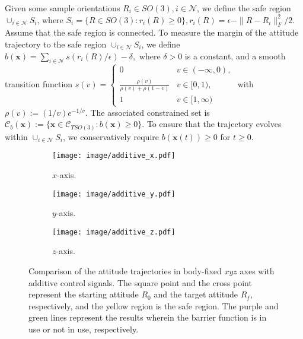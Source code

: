 \documentclass[letterpaper, 10 pt, journal, twoside]{IEEEtran}
\theoremstyle{plain}
\newcommand{\myvar}[1]{\bm{#1}}
\newcommand{\myset}[1]{\mathscr{#1}}
\begin{document}
Given some sample orientations $R_i\in SO(3), i \in \mathcal{N}$, we define the safe region  $\cup_{i \in \mathcal{N}} S_i$, where $S_i = \{ R \in SO(3): r_i(R) \ge 0  \}, r_i(R) = \epsilon - \| R - R_i \|^2_{F}/2$. Assume that the safe region is connected.
To measure the margin of the attitude trajectory  to the safe region $\cup_{i \in \mathcal{N}} S_i$, we define $b(\myvar{x}) = \sum_{i\in \mathcal{N}} s(r_i(R)/\epsilon) - \delta,$
where $ \delta >0$ is a constant,  and a smooth transition function $s(v) = \left\{ \begin{smallmatrix}
0 & v\in ( -\infty,0), \\
 \tfrac{\rho(v)}{\rho(v) + \rho(1 - v)} & v \in [0,1), \\
1 & v \in [1,\infty)
\end{smallmatrix}\right.
$ with $ \rho(v) := (1/v)e^{-1/v} $.  The associated constrained set is $ \myset{C}_b(\myvar{x}):=\{ \myvar{x} \in \myset{C}_{TSO(3)}: b(\myvar{x})\ge 0 \} $. To ensure that the trajectory evolves within $\cup_{i\in \mathcal{N}} S_i$, we conservatively require $b(\myvar{x}(t)) \ge 0$ for $t\ge 0$. 



\begin{figure}[ht]
	\centering
	\begin{subfigure}[t]{0.3\linewidth}
		\texttt{[image: image/additive\_x.pdf]}
		\caption{   $x$-axis. }   
	\end{subfigure}
	\begin{subfigure}[t]{0.3\linewidth}
		\centering\texttt{[image: image/additive\_y.pdf]}
		\caption{ $y$-axis.}
	\end{subfigure}
	\begin{subfigure}[t]{0.3\linewidth}
		\centering\texttt{[image: image/additive\_z.pdf]}
		\caption{  $z$-axis.}
	\end{subfigure}
	\setlength{\belowcaptionskip}{-18pt}
	\caption{  Comparison of the attitude trajectories in body-fixed $xyz$ axes with additive control signals. The square point and  the cross point represent the starting attitude $R_0$ and the target attitude $R_f$, respectively, and the yellow region is the safe region.  The purple and green lines represent the results {wherein} the barrier function is in use or not in use, respectively.  }
	\label{fig:simulated_trajectory_human_input}
	
    \end{figure}
    
\end{document}
